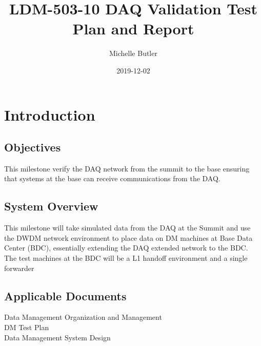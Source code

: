 \documentclass[DM,lsstdraft,STR,toc]{lsstdoc}
\begin{document}
\def\milestoneName{DAQ Validation}
\def\milestoneId{LDM-503-10}
\def\product{Data Management}


\title{ LDM-503-10 DAQ Validation Test Plan and Report}
\setDocRef{\lsstDocType-\lsstDocNum}
\date{2019-12-02}
\author{ Michelle Butler }






\maketitle

\section{Introduction}
\label{sect:intro}


\subsection{Objectives}
\label{sect:objectives}

This milestone verify the DAQ network from the summit to the base
ensuring that systems at the base can receive communications from the
DAQ.~~



\subsection{System Overview}
\label{sect:systemoverview}

This milestone will take simulated data from the DAQ at the Summit and
use the DWDM network environment to place data on DM machines at Base
Data Center (BDC), essentially extending the DAQ extended network to the
BDC. The test machines at the BDC will be a L1 handoff environment and a
single forwarder\\[2\baselineskip]

\subsection{Applicable Documents}\label{applicable-documents}

 Data Management Organization and Management\\
 DM Test Plan\\
 Data Management System Design
\end{document}
